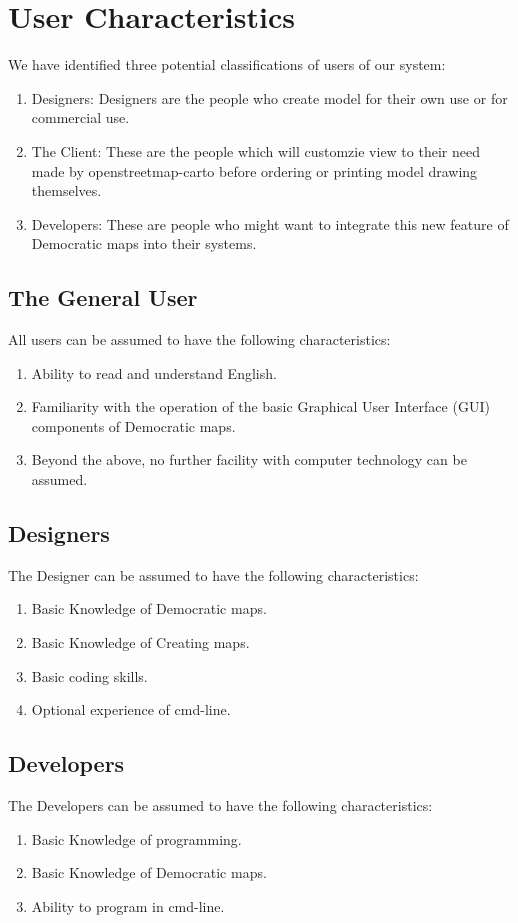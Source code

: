 \section{User Characteristics}

We have identified three potential classifications of users of our system:

\begin{enumerate}
    \item Designers: Designers are the people who create model for their own use or for commercial use.
    \item The Client: These are the people which will customzie view to their need made by openstreetmap-carto before ordering or printing model drawing themselves.
    \item Developers: These are people who might want to integrate this new feature of Democratic maps into their systems.
   
\end{enumerate}

\subsection{The General User}

All users can be assumed to have the following characteristics:

\begin{enumerate}
    \item Ability to read and understand English.
    \item Familiarity with the operation of the basic Graphical User Interface (GUI) components of Democratic maps.
    \item Beyond the above, no further facility with computer technology can be assumed.
\end{enumerate}

\subsection{Designers}
The Designer can be assumed to have the following characteristics:
\begin{enumerate}
    \item Basic Knowledge of Democratic maps.
    \item Basic Knowledge of Creating maps.
    \item Basic coding skills.
    \item Optional experience of cmd-line.
\end{enumerate}

\subsection{Developers}
The Developers can be assumed to have the following characteristics:
\begin{enumerate}
    \item Basic Knowledge of programming.
    \item Basic Knowledge of Democratic maps.
    \item Ability to program in cmd-line.
\end{enumerate}

